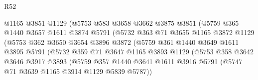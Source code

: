 \begin{lexlean}{R52}
\begin{coremodule}
                                @1165
                                @3851
                                @1129
                                (@5753
                                  @583
                                  @3658
                                  @3662
                                  @3875
                                  @3851
                                  (@5759
                                    @365
                                    @1440
                                    @3657
                                    @1611
                                    @3874
                                    @5791
                                    (@5732
                                      @363
                                      @71
                                      @3655
                                      @1165
                                      @3872
                                      @1129
                                      (@5753
                                        @362
                                        @3650
                                        @3654
                                        @3896
                                        @3872
                                        (@5759
                                          @361
                                          @1440
                                          @3649
                                          @1611
                                          @3895
                                          @5791
                                          (@5732
                                            @359
                                            @71
                                            @3647
                                            @1165
                                            @3893
                                            @1129
                                            (@5753
                                              @358
                                              @3642
                                              @3646
                                              @3917
                                              @3893
                                              (@5759
                                                @357
                                                @1440
                                                @3641
                                                @1611
                                                @3916
                                                @5791
                                                (@5747 @71 @3639 @1165 @3914 @1129 @5839 @5787))

\end{coremodule}
\end{lexlean}
